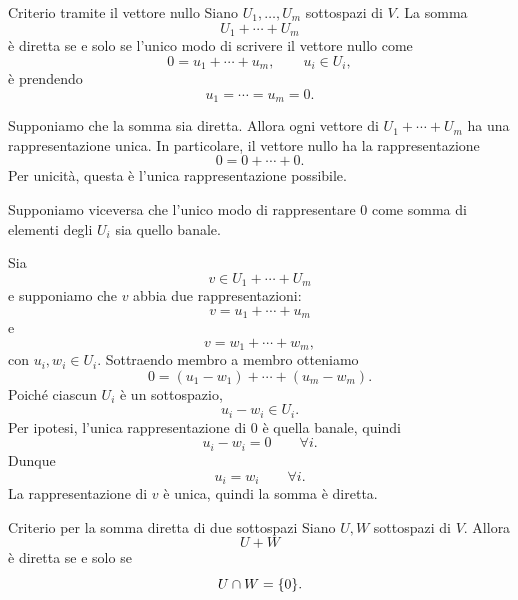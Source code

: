 \documentclass[a4paper]{article}
\begin{document}
\begin{snippetproposition}{Criterio tramite il vettore nullo}
    Siano \(U_1,\ldots,U_m\) sottospazi di \(V\). La somma
    \[
        U_1+\cdots+U_m
    \]
    è diretta se e solo se l'unico modo di scrivere il vettore nullo come
    \[
        0=u_1+\cdots+u_m,
        \qquad
        u_i\in U_i,
    \]
    è prendendo
    \[
        u_1=\cdots=u_m=0.
    \]
\end{snippetproposition}

\begin{snippetproof}{}
    \begin{iffproof}
    \item Supponiamo che la somma sia diretta. Allora ogni vettore di \(U_1+\cdots+U_m\) ha una rappresentazione unica. In particolare, il vettore nullo ha la rappresentazione
        \[
            0=0+\cdots+0.
        \]
        Per unicità, questa è l'unica rappresentazione possibile.

    \item Supponiamo viceversa che l'unico modo di rappresentare \(0\) come somma di elementi degli \(U_i\) sia quello banale.

        Sia
        \[
            v\in U_1+\cdots+U_m
        \]
        e supponiamo che \(v\) abbia due rappresentazioni:
        \[
            v=u_1+\cdots+u_m
        \]
        e
        \[
            v=w_1+\cdots+w_m,
        \]
        con \(u_i,w_i\in U_i\). Sottraendo membro a membro otteniamo
        \[
            0
            =
            (u_1-w_1)+\cdots+(u_m-w_m).
        \]
        Poiché ciascun \(U_i\) è un sottospazio,
        \[
            u_i-w_i\in U_i.
        \]
        Per ipotesi, l'unica rappresentazione di \(0\) è quella banale, quindi
        \[
            u_i-w_i=0
            \qquad
            \forall i.
        \]
        Dunque
        \[
            u_i=w_i
            \qquad
            \forall i.
        \]
        La rappresentazione di \(v\) è unica, quindi la somma è diretta.
    \end{iffproof}
\end{snippetproof}

\begin{snippetproposition}{Criterio per la somma diretta di due sottospazi}
    Siano \(U,W\) sottospazi di \(V\). Allora
    \[
        U+W
    \]
    è diretta se e solo se
    \[
        U\cap W=\{0\}.
    \]
\end{snippetproposition}
\end{document}
